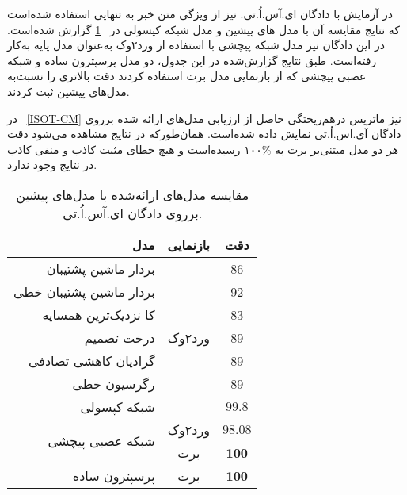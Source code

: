 در آزمایش با دادگان ای.آس.اُ.تی. نیز از ویژگی متن خبر به تنهایی استفاده شده‌است که نتایج مقایسه آن با مدل های پیشین \citet{ahmed2017detection} و مدل شبکه کپسولی \citep{goldani2020detecting} در \tablename~\ref{table.ISOTResults} گزارش شده‌است. در این دادگان نیز مدل شبکه پیچشی با استفاده از ورد۲وک به‌عنوان مدل پایه به‌کار رفته‌است. طبق نتایج گزارش‌شده در این جدول، دو مدل پرسپترون ساده و شبکه عصبی پیچشی که از بازنمایی مدل برت استفاده کردند دقت بالاتری را نسبت‌به مدل‌های پیشین ثبت کردند. 

در \figurename~\ref{ISOT-CM} نیز ماتریس درهم‌ریختگی حاصل از ارزیابی مدل‌های ارائه شده برروی دادگان آی.اس.اُ.تی نمایش داده شده‌است. همان‌طورکه در نتایج مشاهده می‌شود دقت هر دو مدل مبتنی‌بر برت به \%۱۰۰ رسیده‌است و هیچ خطای مثبت کاذب و منفی کاذب در نتایج وجود ندارد.



\begin{table}[!h]
	\caption{ مقایسه مدل‌های ارائه‌شده با مدل‌های پیشین برروی دادگان ای.آس.اُ.تی. }
	\label{table.ISOTResults}
	\begin{center}
		\begin{tabular}{|r|c|c|}
			\hline
			مدل & بازنمایی & دقت \\
			\hline
			\hline
			بردار ماشین پشتیبان &\multirow{7}{*}{ ورد۲وک} & 86 \\
			بردار ماشین پشتیبان خطی &  & 92 \\
			کا نزدیک‌ترین همسایه&  & 83 \\
			درخت تصمیم &  & 89 \\
			گرادیان کاهشی تصادفی &  & 89 \\
			رگرسیون خطی &  & 89 \\
			شبکه کپسولی &  & $99.8$ \\
			\hline 
			\hline 
			\multirow{2}{*}{شبکه عصبی پیچشی} & ورد۲وک & $98.08$ \\
			\cline{2-3}
			& برت & \textbf{100} \\
			\hline
			پرسپترون ساده & برت & \textbf{100} \\
			\hline
		\end{tabular}
	\end{center}
\end{table}

